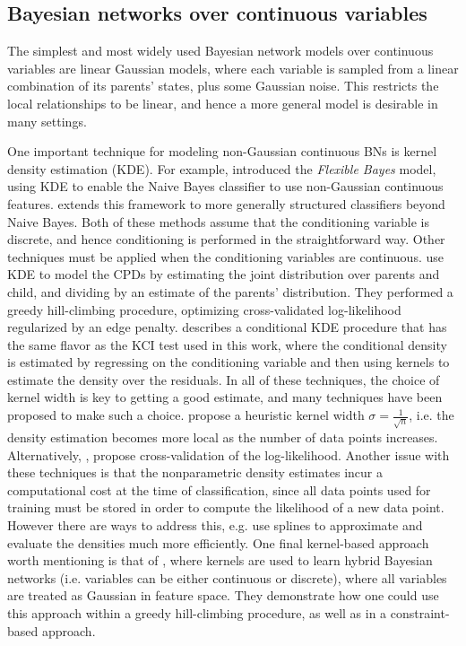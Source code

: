\documentclass{article} %
\begin{document}
\subsection{Bayesian networks over continuous variables}
The simplest and most widely used Bayesian network models over continuous variables are linear Gaussian models, where each variable is sampled from a linear combination of its parents' states, plus some Gaussian noise.  This restricts the local relationships to be linear, and hence a more general model is desirable in many settings.

One important technique for modeling non-Gaussian continuous BNs is kernel density estimation (KDE).  For example, \cite{john1995estimating} introduced the {\it Flexible Bayes} model, using KDE to enable the Naive Bayes classifier to use non-Gaussian continuous features.  \cite{perez2009bayesian} extends this framework to more generally structured classifiers beyond Naive Bayes.  Both of these methods assume that the conditioning variable is discrete, and hence conditioning is performed in the straightforward way.  Other techniques must be applied when the conditioning variables are continuous.  \cite{hofmann1996discovering} use KDE to model the CPDs by estimating the joint distribution over parents and child, and dividing by an estimate of the parents' distribution.  They performed a greedy hill-climbing procedure, optimizing cross-validated log-likelihood regularized by an edge penalty.  \cite{hansen2004nonparametric} describes a conditional KDE procedure that has the same flavor as the KCI test used in this work, where the conditional density is estimated by regressing on the conditioning variable and then using kernels to estimate the density over the residuals.  In all of these techniques, the choice of kernel width is key to getting a good estimate, and many techniques have been proposed to make such a choice.  \cite{john1995estimating} propose a heuristic kernel width $\sigma = \frac{1}{\sqrt n}$, i.e. the density estimation becomes more local as the number of data points increases.  Alternatively, \cite{holmes2012fast}, propose cross-validation of the log-likelihood.  Another issue with these techniques is that the nonparametric density estimates incur a computational cost at the time of classification, since all data points used for training must be stored in order to compute the likelihood of a new data point.  However there are ways to address this, e.g. \cite{gurwicz2004rapid} use splines to approximate and evaluate the densities much more efficiently.  One final kernel-based approach worth mentioning is that of \cite{bach2002learning}, where kernels are used to learn hybrid Bayesian networks (i.e. variables can be either continuous or discrete), where all variables are treated as Gaussian in feature space.  They demonstrate how one could use this approach within a greedy hill-climbing procedure, as well as in a constraint-based approach.
\end{document}
